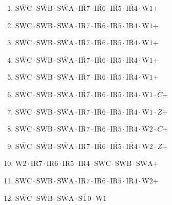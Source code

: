 \documentclass[UTF8]{ctexart}
\begin{document}
\begin{enumerate}[\indent\indent]
	\item $\overline{\text{SWC}} \cdot\overline{\text{SWB}}\cdot \overline{\text{SWA}} \cdot \overline{\text{IR7}} \cdot \overline{\text{IR6}} \cdot \overline{\text{IR5}} \cdot \overline{\text{IR4}} \cdot \text{W1}$+
	\item $\overline{\text{SWC}} \cdot\overline{\text{SWB}}\cdot \overline{\text{SWA}} \cdot \overline{\text{IR7}} \cdot \overline{\text{IR6}} \cdot \overline{\text{IR5}} \cdot \text{IR4} \cdot \text{W1}$+
	\item $\overline{\text{SWC}} \cdot\overline{\text{SWB}}\cdot \overline{\text{SWA}} \cdot \overline{\text{IR7}} \cdot \overline{\text{IR6}} \cdot \text{IR5} \cdot \overline{\text{IR4}} \cdot \text{W1}$+
	\item $\overline{\text{SWC}} \cdot\overline{\text{SWB}}\cdot \overline{\text{SWA}} \cdot \overline{\text{IR7}} \cdot \overline{\text{IR6}} \cdot \text{IR5} \cdot \text{IR4} \cdot \text{W1}$+
	\item $\overline{\text{SWC}} \cdot\overline{\text{SWB}}\cdot \overline{\text{SWA}} \cdot \overline{\text{IR7}} \cdot \text{IR6} \cdot \overline{\text{IR5}} \cdot \overline{\text{IR4}} \cdot \text{W1}$+
	\item $\overline{\text{SWC}} \cdot\overline{\text{SWB}}\cdot \overline{\text{SWA}} \cdot \overline{\text{IR7}} \cdot \text{IR6} \cdot \text{IR5} \cdot \text{IR4} \cdot \text{W1} \cdot \overline{C}$+
	\item $\overline{\text{SWC}} \cdot\overline{\text{SWB}}\cdot \overline{\text{SWA}} \cdot \text{IR7} \cdot \overline{\text{IR6}} \cdot \overline{\text{IR5}} \cdot \overline{\text{IR4}} \cdot \text{W1} \cdot \overline{Z}$+
	\item $\overline{\text{SWC}} \cdot\overline{\text{SWB}}\cdot \overline{\text{SWA}} \cdot \overline{\text{IR7}} \cdot \text{IR6} \cdot \text{IR5} \cdot \text{IR4} \cdot \text{W2} \cdot C$+
	\item $\overline{\text{SWC}} \cdot\overline{\text{SWB}}\cdot \overline{\text{SWA}} \cdot \text{IR7} \cdot \overline{\text{IR6}} \cdot \overline{\text{IR5}} \cdot \overline{\text{IR4}} \cdot \text{W2} \cdot Z$+
	\item $\text{W2} \cdot \overline{\text{IR7}} \cdot \text{IR6} \cdot \overline{\text{IR5}} \cdot \text{IR4} \cdot \overline{\text{SWC}} \cdot\overline{\text{SWB}}\cdot \overline{\text{SWA}}$+
	\item $\overline{\text{SWC}} \cdot\overline{\text{SWB}}\cdot \overline{\text{SWA}} \cdot \overline{\text{IR7}} \cdot \text{IR6} \cdot \text{IR5} \cdot \overline{\text{IR4}} \cdot \text{W2}$+
	\item $\overline{\text{SWC}}\cdot\overline{\text{SWB}}\cdot\overline{\text{SWA}}\cdot\overline{\text{ST0}}\cdot\text{W1}$
\end{enumerate}
\end{document}
